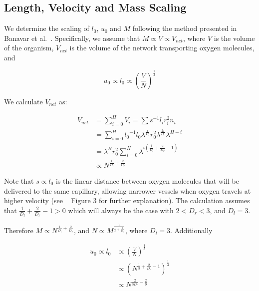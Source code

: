 \documentclass[12pt]{article}
\begin{document}
\begin{caseof}

\end{caseof}

\subsection{Length, Velocity and Mass Scaling}
\label{subsec:appendixLengthMass}

We determine the scaling of $l_0$, $u_0$ and $M$ following the method 
presented in Banavar et al.~\cite{banavar10}. Specifically, we assume that $M
\propto V \propto V_{net}$, where $V$ is the volume of the organism, $V_{net}$ is the volume of the network
transporting oxygen molecules, and

\begin{equation}
u_0 \propto l_0 \propto \left (\frac{V}{N} \right) ^{\frac{1}{3}}
\end{equation}

We calculate $V_{net}$ as: 

\begin{align*}
V_{net} &= \sum_{i=0}^H V_i = \sum s^{-1} l_i r_i^2 n_i \\
  &= \sum_{i=0}^H {l_0}^{-1} l_0 \lambda^{\frac{i}{D_l}} r_0^2 \lambda^{\frac{2i}{D_r}}
  \lambda^{H-i} \\
  &= \lambda^H r_0^2 \sum_{i=0}^H \lambda^{i \left(\frac{i}{D_l} +
  \frac{2}{D_r} - 1 \right) } \\
  &\propto N^{\frac{1}{D_l} + \frac{2}{D_r}} 
\end{align*}

Note that $s \propto l_0$ is the linear distance between oxygen molecules that will be delivered to the same capillary, allowing narrower vessels when oxygen travels at higher velocity (see ~\cite{banavar10} Figure 3 for further explanation). The calculation assumes that $\frac{1}{D_l} + \frac{2}{D_r} -1 > 0$ which
will always be the case with $2 < D_r < 3$, and $D_l=3$. 

Therefore $M\propto N^{\frac{1}{D_l} +
\frac{2}{D_r}}$,
and $N \propto M^{\frac{1}{\frac{1}{3} + \frac{2}{D_r}}}$, where $D_l=3$.
Additionally

\begin{align*}
u_0 \propto l_0 & \propto \left( \frac{V}{N} \right)^{\frac{1}{3}} \\
    & \propto \left( N^{\frac{1}{3} + \frac{2}{D_r} - 1} \right)^{\frac{1}{3}} \\
    & \propto N^{\frac{2}{3D_r} - \frac{2}{9}}
\end{align*}
\end{document}
